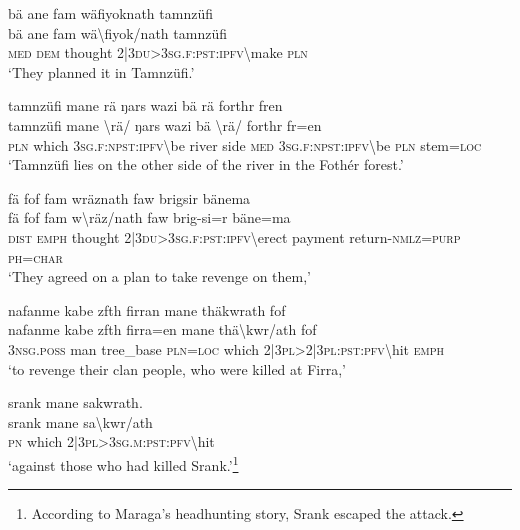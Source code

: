 \newpage
\ea\label{ex:5:a1438}
bä ane fam wäfiyoknath tamnzüfi\\
\gll bä	ane	fam	wä{\textbackslash}fiyok/nath	tamnzüfi\\
     \textsc{med}	\textsc{dem}	thought	2|3\textsc{du}>3\textsc{sg}.\textsc{f}:\textsc{pst}:\textsc{ipfv}{\textbackslash}make	\textsc{pln}\\
\glt `They planned it in Tamnzüfi.'
\z

\ea\label{ex:5:a1440}
tamnzüfi mane rä ŋars wazi bä rä forthr fren\\
\gll tamnzüfi	mane	{\textbackslash}rä/	ŋars	wazi	bä	{\textbackslash}rä/	forthr	fr=en\\
     \textsc{pln}	which	3\textsc{sg}.\textsc{f}:\textsc{npst}:\textsc{ipfv}{\textbackslash}be	river	side	\textsc{med}	3\textsc{sg}.\textsc{f}:\textsc{npst}:\textsc{ipfv}{\textbackslash}be	\textsc{pln}	stem=\textsc{loc}\\
\glt `Tamnzüfi lies on the other side of the river in the Fothér forest.'
\z

\ea\label{ex:5:a1441}
fä fof fam wräznath faw brigsir bänema\\
\gll fä	fof	fam	w{\textbackslash}räz/nath	faw	brig-si=r	bäne=ma\\
     \textsc{dist}	\textsc{emph}	thought	2|3\textsc{du}>3\textsc{sg}.\textsc{f}:\textsc{pst}:\textsc{ipfv}{\textbackslash}erect	payment	return-\textsc{nmlz}=\textsc{purp}	\textsc{ph}=\textsc{char}\\
\glt `They agreed on a plan to take revenge on them,'
\z

\ea\label{ex:5:a1443}
nafanme kabe zfth firran mane thäkwrath fof\\
\gll nafanme	kabe	zfth	firra=en	mane	thä{\textbackslash}kwr/ath	fof\\
     3\textsc{nsg}.\textsc{poss}	man	tree\_base	\textsc{pln}=\textsc{loc}	which	2|3\textsc{pl}>2|3\textsc{pl}:\textsc{pst}:\textsc{pfv}{\textbackslash}hit	\textsc{emph}\\
\glt `to revenge their clan people, who were killed at Firra,'
\z

\ea\label{ex:5:a1444}
srank mane sakwrath.\\
\gll srank	mane	sa{\textbackslash}kwr/ath\\
     \textsc{pn}	which	2|3\textsc{pl}>3\textsc{sg}.\textsc{m}:\textsc{pst}:\textsc{pfv}{\textbackslash}hit\\
\glt `against those who had killed Srank.'\footnote{According to Maraga's headhunting story, Srank escaped the attack.}
\z

